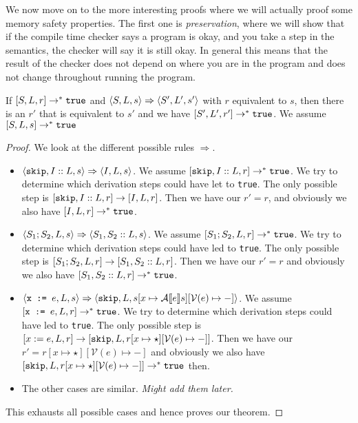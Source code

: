 We now move on to the more interesting proofs where we will actually proof some memory safety properties. 
The first one is \emph{preservation}, where we will show that if the compile time checker says a program is okay, and you take a step in the semantics, the checker will say it is still okay. In general this means that the result of the checker does not depend on where you are in the program and does not change throughout running the program. 

\begin{theorem}
If $[ S, L, r ] \to ^* \texttt{true}$ and $\langle S, L, s \rangle \Rightarrow \langle S', L', s' \rangle$ with $r$ equivalent to $s$, then there is an $r'$ that is equivalent to $s'$ and we have $[ S', L', r' ] \to ^* \texttt{true}$. We assume $[ S, L, s ] \to ^* \texttt{true}$
\end{theorem}

\begin{proof}
We look at the different possible rules $\Rightarrow$. 
\begin{itemize}
    \item $\langle \texttt{skip}, I::L, s \rangle \Rightarrow \langle I, L, s \rangle$. We assume $[ \texttt{skip}, I::L, r ] \to ^* \texttt{true}$. We try to determine which derivation steps could have let to \texttt{true}. The only possible step is $[ \texttt{skip}, I::L, r ]\to [ I, L, r ]$. Then we have our $r' = r$, and obviously we also have $[ I, L, r ] \to^* \texttt{true}$.
    \item $\langle S_1; S_2, L, s \rangle \Rightarrow \langle S_1, S_2::L, s \rangle$. We assume $[ S_1; S_2, L, r ] \to ^* \texttt{true}$. We try to determine which derivation steps could have led to \texttt{true}. The only possible step is $[ S_1; S_2, L, r ] \to [ S_1, S_2::L, r ]$. Then we have our $r' = r$ and obviously we also have $[ S_1, S_2::L, r ] \to^* \texttt{true}$.
    \item $\langle \texttt{x := } e, L, s \rangle \Rightarrow \langle \texttt{skip}, L, s[x \mapsto \mathcal{A} \llbracket e \rrbracket s][\mathcal{V}(e)\mapsto-] \rangle$. We assume $[ \texttt{x := } e, L, r ] \to ^* \texttt{true}$. We try to determine which derivation steps could have led to \texttt{true}. The only possible step is $[ x:=e, L, r ] \to [ \texttt{skip}, L, r[x\mapsto \star][\mathcal{V}(e) \mapsto -] ]$. Then we have our $r' = r[x\mapsto \star][\mathcal{V}(e) \mapsto -]$ and obviously we also have $[ \texttt{skip}, L, r[x\mapsto \star][\mathcal{V}(e) \mapsto -] ] \to^* \texttt{true}$ then.
    \item The other cases are similar. \emph{Might add them later.}
\end{itemize}
This exhausts all possible cases and hence proves our theorem.
\end{proof}

